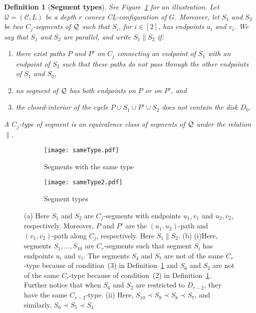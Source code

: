 \documentclass{article}
\newtheorem{definition}[theorem]{Definition}
\numberwithin{claimcounter}{lemma}
\begin{document}
\begin{definition}[{\bf Segment types}]\label{D:ST}
 See Figure~\ref{fig:sameType} for an illustration. Let $\mathcal{Q}=(\mathcal{C},L)$ be a depth $r$ convex CL-configuration of $G$. Moreover, let $S_{1}$ and $S_{2}$ be two $C_j$-segments of ${\cal Q}$ such that $S_i$, for $i\in [2]$, has endpoints $u_i$ and $v_i$. We say that $S_{1}$ and $S_{2}$ are {\em parallel}, and  write $S_1\parallel S_2$ if:
 \begin{enumerate}
     \item there exist paths $P$ and $P'$  on $C_j$
connecting an endpoint of $S_{1}$ with an endpoint of $S_{2}$ 
such that these paths do not pass through the other endpoints of $S_1$ and $S_2$, 
    \item no  segment of ${\cal Q}$ has both
endpoints on $P$ or on $P'$, and
\item the closed-interior of  the cycle $P\cup S_{1}\cup P'\cup S_{2}$ does not contain
the disk $D_{0}$. 
 \end{enumerate}
A \emph{$C_j$-type of segment} is an equivalence class of segments of ${\cal Q}$ under the relation $\parallel$.    
\end{definition}

\begin{figure}
\centering
\begin{subfigure}{.5\textwidth}
  \centering
  \captionsetup{justification=centering}
  \texttt{[image: sameType.pdf]}
  \caption{Segments with the same type}
  \label{fig:sameType}
\end{subfigure}\begin{subfigure}{.5\textwidth}
  \centering
  \captionsetup{justification=centering}
  \texttt{[image: sameType2.pdf]}
  \caption{Segment types}
  \label{fig:segments}
\end{subfigure}

\caption{(a) Here $S_1$ and $S_2$ are $C_j$-segments with endpoints $u_1,v_1$ and $u_2,v_2$, respectively. Moreover, $P$ and $P'$ are the $(u_1,u_2)$-path and $(v_1,v_2)$-path along $C_j$, respectively. Here $S_1 \parallel S_2$. (b) (i)Here, segments $S_1,\ldots,S_{10}$ are $C_r$-segments such that segment $S_i$ has endpoints $u_i$ and $v_i$.  The segments $S_4$ and $S_7$ are not of the same $C_r$-type because of condition~(3) in Definition~\ref{D:ST} and $S_6$ and $S_2$ are not of the same $C_r$-type because of condition~(2) in Definition~\ref{D:ST}. Further notice that when $S_6$ and $S_2$ are restricted to $D_{r-2}$, they have the same $C_{r-2}$-type. 
    (ii) Here, $S_{10}\prec S_9 \prec S_8 \prec S_7$, and similarly, $S_6\prec S_5\prec S_4$}
\label{fig:segmentFigure}
\end{figure}
\end{document}
